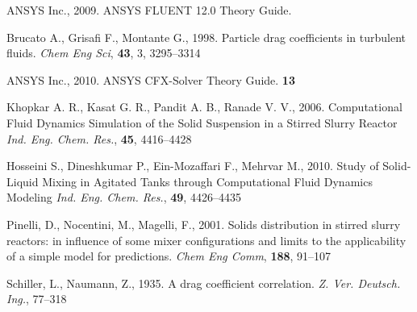 \begin{thebibliography}{99}

 ANSYS Inc., 2009. ANSYS FLUENT 12.0 Theory Guide.

 Brucato A., Grisafi F., Montante G., 1998. Particle drag coefficients in turbulent fluids. \textit{Chem Eng Sci}, \textbf{43}, 3, 3295--3314

 ANSYS Inc., 2010. ANSYS CFX-Solver Theory Guide. \textbf{13}

 Khopkar A. R., Kasat G. R., Pandit A. B., Ranade V. V.,  2006. Computational Fluid Dynamics Simulation of the Solid Suspension in a Stirred Slurry Reactor \textit{Ind. Eng. Chem. Res.}, \textbf{45}, 4416--4428

 Hosseini S., Dineshkumar P., Ein-Mozaffari F., Mehrvar M., 2010. Study of Solid-Liquid Mixing in Agitated Tanks through Computational Fluid Dynamics Modeling \textit{Ind. Eng. Chem. Res.}, \textbf{49}, 4426--4435

 Pinelli, D., Nocentini, M., Magelli, F., 2001. Solids distribution in stirred slurry reactors: in influence of some mixer configurations and limits to the applicability of a simple model for predictions.
\textit{Chem Eng Comm}, \textbf{188}, 91--107

 Schiller, L., Naumann, Z., 1935. A drag coefficient correlation. \textit{Z. Ver. Deutsch. Ing.}, 77--318

\end{thebibliography}
